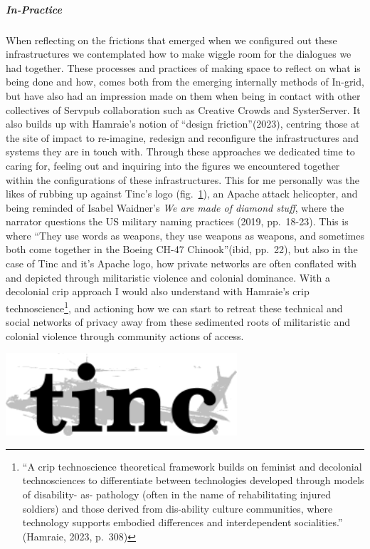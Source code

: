 \hypertarget{in-practice}{%
\subparagraph[In-Practice]{\texorpdfstring{\protect\hypertarget{anchor}{}{}In-Practice}{In-Practice}}\label{in-practice}}

When reflecting on the frictions that emerged when we configured out
these infrastructures we contemplated how to make wiggle room for the
dialogues we had together. These processes and practices of making space
to reflect on what is being done and how, comes both from the emerging
internally methods of In-grid, but have also had an impression made on
them when being in contact with other collectives of Servpub
collaboration such as Creative Crowds and SysterServer. It also builds
up with Hamraie's notion of ``design friction''(2023), centring those at
the site of impact to re-imagine, redesign and reconfigure the
infrastructures and systems they are in touch with. Through these
approaches we dedicated time to caring for, feeling out and inquiring
into the figures we encountered together within the configurations of
these infrastructures. This for me personally was the likes of rubbing
up against Tinc's logo (fig.~\protect\hyperlink{fig:tincLogo}{1}), an
Apache attack helicopter, and being reminded of Isabel Waidner's
\emph{We are made of diamond stuff}, where the narrator questions the US
military naming practices (2019, pp.~18-23). This is where ``They use
words as weapons, they use weapons as weapons, and sometimes both come
together in the Boeing CH-47 Chinook''(ibid, pp.~22), but also in the
case of Tinc and it's Apache logo, how private networks are often
conflated with and depicted through militaristic violence and colonial
dominance. With a decolonial crip approach I would also understand with
Hamraie's crip technoscience\footnote{``A crip technoscience theoretical
  framework builds on feminist and decolonial technosciences to
  differentiate between technologies developed through models of
  disability- as- pathology (often in the name of rehabilitating injured
  soldiers) and those derived from dis-ability culture communities,
  where technology supports embodied differences and interdependent
  socialities.'' (Hamraie, 2023, p.~308)}, and actioning how we can
start to retreat these technical and social networks of privacy away
from these sedimented roots of militaristic and colonial violence
through community actions of access.

\includegraphics[width=3.38889in,height=1.20833in]{../../Chapters/media_05_In-Configure-Ability/Pictures/0.png}

